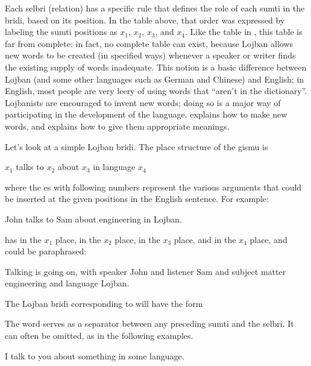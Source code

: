 Each selbri (relation) has a specific rule that defines the role of each sumti in the bridi, based on its position. In the table above, that order was expressed by labeling the sumti positions as $x_1$, $x_2$, $x_3$, and $x_4$. Like the table in , this table is far from complete: in fact, no complete table can exist, because Lojban allows new words to be created (in specified ways) whenever a speaker or writer finds the existing supply of words inadequate. This notion is a basic difference between Lojban (and some other languages such as German and Chinese) and English; in English, most people are very leery of using words that ``aren't in the dictionary''. Lojbanists are encouraged to invent new words; doing so is a major way of participating in the development of the language.  explains how to make new words, and  explains how to give them appropriate meanings.



Let's look at a simple Lojban bridi. The place structure of the gismu  is
\begin{example}
$x_1$ talks to $x_2$ about $x_3$ in language $x_4$
\end{example}

{\noindent}where the es with following numbers represent the various arguments that could be inserted at the given positions in the English sentence. For example:
\begin{example}
John talks to Sam about engineering in Lojban.
\end{example}

{\noindent}has  in the $x_1$ place,  in the $x_2$ place,  in the $x_3$ place, and  in the $x_4$ place, and could be paraphrased:
\begin{example}
Talking is going on,\n
\T	with speaker John\n
\T	and listener Sam\n
\T	and subject matter engineering\n
\T	and language Lojban.
\end{example}

The Lojban bridi corresponding to  will have the form
\begin{example}
     
\end{example}

The word  serves as a separator between any preceding sumti and the selbri. It can often be omitted, as in the following examples.
\begin{example}
    \n
I talk to you about something in some language.
\end{example}


